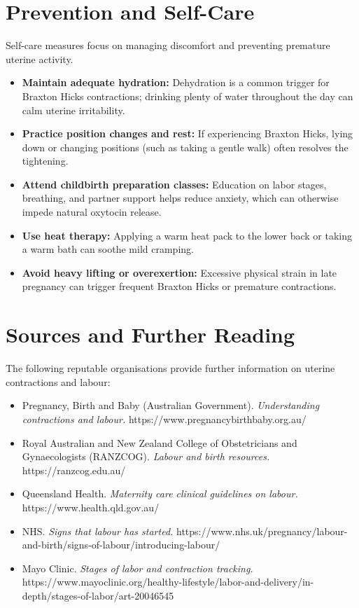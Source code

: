 \section*{Prevention and Self-Care}
Self-care measures focus on managing discomfort and preventing premature uterine activity.
\begin{itemize}
    \item \textbf{Maintain adequate hydration:} Dehydration is a common trigger for Braxton Hicks contractions; drinking plenty of water throughout the day can calm uterine irritability.
    \item \textbf{Practice position changes and rest:} If experiencing Braxton Hicks, lying down or changing positions (such as taking a gentle walk) often resolves the tightening.
    \item \textbf{Attend childbirth preparation classes:} Education on labor stages, breathing, and partner support helps reduce anxiety, which can otherwise impede natural oxytocin release.
    \item \textbf{Use heat therapy:} Applying a warm heat pack to the lower back or taking a warm bath can soothe mild cramping.
    \item \textbf{Avoid heavy lifting or overexertion:} Excessive physical strain in late pregnancy can trigger frequent Braxton Hicks or premature contractions.
\end{itemize}

\section*{Sources and Further Reading}
The following reputable organisations provide further information on uterine contractions and labour:
\begin{itemize}
    \item Pregnancy, Birth and Baby (Australian Government). \textit{Understanding contractions and labour.} https://www.pregnancybirthbaby.org.au/
    \item Royal Australian and New Zealand College of Obstetricians and Gynaecologists (RANZCOG). \textit{Labour and birth resources.} https://ranzcog.edu.au/
    \item Queensland Health. \textit{Maternity care clinical guidelines on labour.} https://www.health.qld.gov.au/
    \item NHS. \textit{Signs that labour has started.} https://www.nhs.uk/pregnancy/labour-and-birth/signs-of-labour/introducing-labour/
    \item Mayo Clinic. \textit{Stages of labor and contraction tracking.} https://www.mayoclinic.org/healthy-lifestyle/labor-and-delivery/in-depth/stages-of-labor/art-20046545
\end{itemize}
